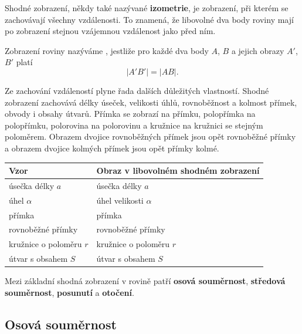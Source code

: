 \documentclass[12pt,a4paper]{article}
\begin{document}
Shodné zobrazení, někdy také nazývané \textbf{izometrie}, je zobrazení, při kterém se zachovávají všechny vzdálenosti. To znamená, že libovolné dva body roviny mají po zobrazení stejnou vzájemnou vzdálenost jako před ním.

\begin{definitionbox}
    Zobrazení roviny nazýváme , jestliže pro každé dva body $A$, $B$ a jejich obrazy $A'$, $B'$ platí
    \[
        |A'B'|=|AB|.
    \]
\end{definitionbox}

Ze zachování vzdáleností plyne řada dalších důležitých vlastností. Shodné zobrazení zachovává délky úseček, velikosti úhlů, rovnoběžnost a kolmost přímek, obvody i obsahy útvarů. Přímka se zobrazí na přímku, polopřímka na polopřímku, polorovina na polorovinu a kružnice na kružnici se stejným poloměrem. Obrazem dvojice rovnoběžných přímek jsou opět rovnoběžné přímky a obrazem dvojice kolmých přímek jsou opět přímky kolmé.

\begin{center}
\begin{tabular}{|C{5.2cm}|C{8.2cm}|}
    \hline
    \textbf{Vzor} & \textbf{Obraz v libovolném shodném zobrazení} \\
    \hline
    úsečka délky $a$ & úsečka délky $a$ \\
    \hline
    úhel $\alpha$ & úhel velikosti $\alpha$ \\
    \hline
    přímka & přímka \\
    \hline
    rovnoběžné přímky & rovnoběžné přímky \\
    \hline
    kružnice o poloměru $r$ & kružnice o poloměru $r$ \\
    \hline
    útvar s obsahem $S$ & útvar s obsahem $S$ \\
    \hline
\end{tabular}
\end{center}

Mezi základní shodná zobrazení v rovině patří \textbf{osová souměrnost}, \textbf{středová souměrnost}, \textbf{posunutí} a \textbf{otočení}.



\subsection{Osová souměrnost}
\end{document}
